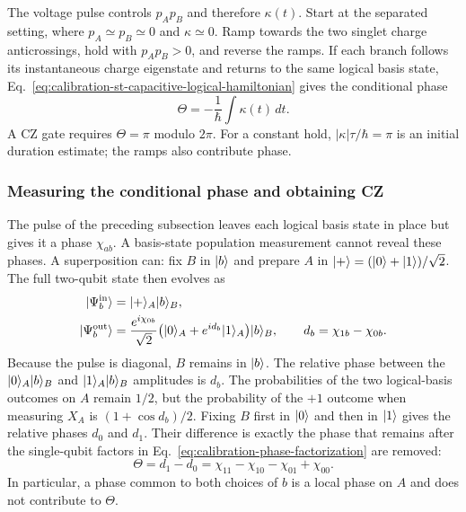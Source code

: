The voltage pulse controls $p_Ap_B$ and therefore $\kappa(t)$.
Start at the separated setting, where $p_A\simeq p_B\simeq0$ and
$\kappa\simeq0$. Ramp towards the two singlet charge
anticrossings, hold with $p_Ap_B>0$, and reverse the ramps. If each
branch follows its instantaneous charge eigenstate and returns to
the same logical basis state, Eq.~\eqref{eq:calibration-st-capacitive-logical-hamiltonian}
gives the conditional phase
\begin{equation}
 \Theta=-\frac1\hbar\int\kappa(t)\,dt .
 \label{eq:calibration-conditional-phase}
\end{equation}
A CZ gate requires $\Theta=\pi$ modulo $2\pi$. For a constant hold,
$|\kappa|\tau/\hbar=\pi$ is an initial duration estimate; the ramps
also contribute phase.

\subsubsection{Measuring the conditional phase and obtaining CZ}
\label{sec:calibration-conditional-phase-measurement}

The pulse of the preceding subsection leaves each logical basis
state in place but gives it a phase $\chi_{ab}$. A basis-state
population measurement cannot reveal these phases. A superposition
can: fix $B$ in $\lvert b\rangle$ and prepare $A$ in
$\lvert +\rangle=(\lvert 0\rangle+\lvert 1\rangle)/\sqrt2$. The full two-qubit state then evolves as
\begin{equation}
 \begin{aligned}
 \ket{\Psi_b^{\mathrm{in}}}
 &=\ket{+}_A\ket b_B,\\
 \ket{\Psi_b^{\mathrm{out}}}
 &=\frac{e^{i\chi_{0b}}}{\sqrt2}
   \bigl(\ket0_A+e^{id_b}\ket1_A\bigr)\ket b_B,
 \qquad d_b=\chi_{1b}-\chi_{0b}.
 \end{aligned}
 \label{eq:calibration-conditional-ramsey-state}
\end{equation}
Because the pulse is diagonal, $B$ remains in $\lvert b\rangle$. The relative
phase between the $\lvert 0\rangle_A\lvert b\rangle_B$ and $\lvert 1\rangle_A\lvert b\rangle_B$ amplitudes
is $d_b$. The probabilities of the two logical-basis outcomes on $A$
remain $1/2$, but the probability of the $+1$ outcome when measuring
$X_A$ is $(1+\cos d_b)/2$. Fixing $B$ first in $\lvert 0\rangle$ and then
in $\lvert 1\rangle$ gives the
relative phases $d_0$ and $d_1$. Their difference is exactly
the phase that remains after the single-qubit factors in
Eq.~\eqref{eq:calibration-phase-factorization} are removed:
\begin{equation}
 \Theta=d_1-d_0
 =\chi_{11}-\chi_{10}-\chi_{01}+\chi_{00}.
 \label{eq:calibration-conditional-ramsey}
\end{equation}
In particular, a phase common to both choices of $b$ is a local
phase on $A$ and does not contribute to $\Theta$.

